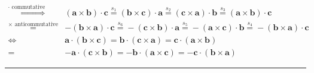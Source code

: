\documentclass[
]{book}
\theoremstyle{definition}
\theoremstyle{definition}
\theoremstyle{definition}
\theoremstyle{definition}
\theoremstyle{remark}
\begin{document}
\[\begin{aligned}
\overset{\cdot\text{ commutative}}{\Rightarrow} & \left(\boldsymbol{a}\times\boldsymbol{b}\right)\cdot\boldsymbol{c}\overset{s_{{\scriptscriptstyle 1}}}{=}\left(\boldsymbol{b}\times\boldsymbol{c}\right)\cdot\boldsymbol{a}\overset{s_{{\scriptscriptstyle 2}}}{=}\left(\boldsymbol{c}\times\boldsymbol{a}\right)\cdot\boldsymbol{b}\overset{s_{{\scriptscriptstyle 3}}}{=}\left(\boldsymbol{a}\times\boldsymbol{b}\right)\cdot\boldsymbol{c}\\
\overset{\times\text{ anticommutative}}{=} & -\left(\boldsymbol{b}\times\boldsymbol{a}\right)\cdot\boldsymbol{c}\overset{s_{{\scriptscriptstyle 6}}}{=}-\left(\boldsymbol{c}\times\boldsymbol{b}\right)\cdot\boldsymbol{a}\overset{s_{{\scriptscriptstyle 5}}}{=}-\left(\boldsymbol{a}\times\boldsymbol{c}\right)\cdot\boldsymbol{b}\overset{s_{{\scriptscriptstyle 4}}}{=}-\left(\boldsymbol{b}\times\boldsymbol{a}\right)\cdot\boldsymbol{c}\\
\Leftrightarrow & \boldsymbol{a}\cdot\left(\boldsymbol{b}\times\boldsymbol{c}\right)=\boldsymbol{b}\cdot\left(\boldsymbol{c}\times\boldsymbol{a}\right)=\boldsymbol{c}\cdot\left(\boldsymbol{a}\times\boldsymbol{b}\right)\\
= & -\boldsymbol{a}\cdot\left(\boldsymbol{c}\times\boldsymbol{b}\right)=-\boldsymbol{b}\cdot\left(\boldsymbol{a}\times\boldsymbol{c}\right)=-\boldsymbol{c}\cdot\left(\boldsymbol{b}\times\boldsymbol{a}\right)
\end{aligned}
\]

\begin{center}\rule{0.5\linewidth}{0.5pt}\end{center}
\end{document}
